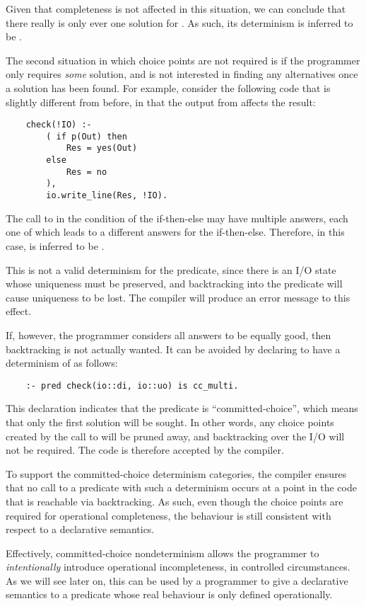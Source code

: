 Given that completeness is not affected in this situation,
we can conclude that
there really is only ever one solution for .
As such, its determinism is inferred to be .

The second situation in which choice points are not required
is if the programmer only requires \emph{some} solution,
and is not interested in finding any alternatives
once a solution has been found.
For example, consider the following code
that is slightly different from before,
in that the output from  affects the result:
\begin{verbatim}
    check(!IO) :-
        ( if p(Out) then
            Res = yes(Out)
        else
            Res = no
        ),
        io.write_line(Res, !IO).
\end{verbatim}
The call to  in the condition of the if-then-else
may have multiple answers,
each one of which leads to a different answers for the if-then-else.
Therefore, in this case,  is inferred to be .

This is not a valid determinism for the predicate,
since there is an I/O state whose uniqueness must be preserved,
and backtracking into the predicate
will cause uniqueness to be lost.
The compiler will produce an error message to this effect.

If, however,
the programmer considers all answers to be equally good,
then backtracking is not actually wanted.
It can be avoided by declaring 
to have a determinism of  as follows:
\begin{verbatim}
    :- pred check(io::di, io::uo) is cc_multi.
\end{verbatim}
This declaration indicates that the predicate is ``committed-choice'',
which means that only the first solution will be sought.
In other words,
any choice points created by the call to  will be pruned away,
and backtracking over the I/O will not be required.
The code is therefore accepted by the compiler.

To support the committed-choice determinism categories,
the compiler ensures that
no call to a predicate with such a determinism
occurs at a point in the code that is reachable via backtracking.
As such,
even though the choice points are required
for operational completeness,
the behaviour is still consistent
with respect to a declarative semantics.

Effectively,
committed-choice nondeterminism allows the programmer
to \emph{intentionally} introduce operational incompleteness,
in controlled circumstances.
As we will see later on,
this can be used by a programmer
to give a declarative semantics to a predicate
whose real behaviour is only defined operationally.


